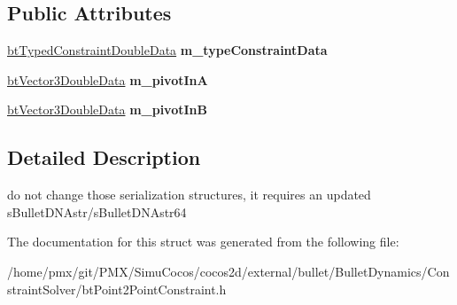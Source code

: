 \subsection*{Public Attributes}
\begin{DoxyCompactItemize}
\item 
\mbox{\label{structbtPoint2PointConstraintDoubleData2_abd3d478126f26324a414e60ade0e2c4c}} 
\hyperlink{structbtTypedConstraintDoubleData}{bt\+Typed\+Constraint\+Double\+Data} {\bfseries m\+\_\+type\+Constraint\+Data}
\item 
\mbox{\label{structbtPoint2PointConstraintDoubleData2_abd97c7547012d8e87ff8b0780c9c58a5}} 
\hyperlink{structbtVector3DoubleData}{bt\+Vector3\+Double\+Data} {\bfseries m\+\_\+pivot\+InA}
\item 
\mbox{\label{structbtPoint2PointConstraintDoubleData2_a9cf5d886d95691c1ea36b48d4b80f2be}} 
\hyperlink{structbtVector3DoubleData}{bt\+Vector3\+Double\+Data} {\bfseries m\+\_\+pivot\+InB}
\end{DoxyCompactItemize}


\subsection{Detailed Description}
do not change those serialization structures, it requires an updated s\+Bullet\+D\+N\+Astr/s\+Bullet\+D\+N\+Astr64 

The documentation for this struct was generated from the following file\+:\begin{DoxyCompactItemize}
\item 
/home/pmx/git/\+P\+M\+X/\+Simu\+Cocos/cocos2d/external/bullet/\+Bullet\+Dynamics/\+Constraint\+Solver/bt\+Point2\+Point\+Constraint.\+h\end{DoxyCompactItemize}
